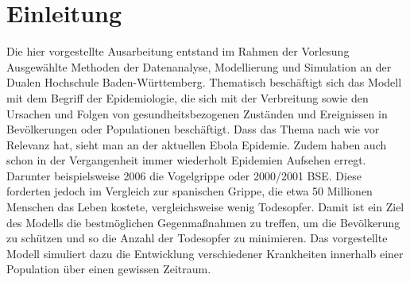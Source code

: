 \section*{Einleitung}

Die hier vorgestellte Ausarbeitung entstand im Rahmen der Vorlesung \glqq Ausgewählte Methoden der Datenanalyse, Modellierung und Simulation\grqq\; an der Dualen Hochschule Baden-Württemberg. Thematisch beschäftigt sich das Modell mit dem Begriff der Epidemiologie, die sich mit der Verbreitung sowie den Ursachen und Folgen von gesundheitsbezogenen Zuständen und Ereignissen in Bevölkerungen oder Populationen beschäftigt. %
Dass das Thema nach wie vor Relevanz hat, sieht man an der aktuellen Ebola Epidemie. Zudem haben auch schon in der Vergangenheit immer wiederholt Epidemien Aufsehen erregt. Darunter beispielsweise 2006 die Vogelgrippe \cite{gehlhoff2007chronik}
oder 2000/2001 BSE\cite{Spon:2014}. Diese forderten jedoch im Vergleich zur spanischen Grippe, die etwa 50 Millionen Menschen das Leben kostete, vergleichsweise wenig Todesopfer.
Damit ist ein Ziel des Modells die bestmöglichen Gegenmaßnahmen zu treffen, um die Bevölkerung zu schützen und so die Anzahl der Todesopfer zu minimieren.
Das vorgestellte Modell simuliert dazu die Entwicklung verschiedener Krankheiten innerhalb einer Population über einen gewissen Zeitraum. 



%
%
